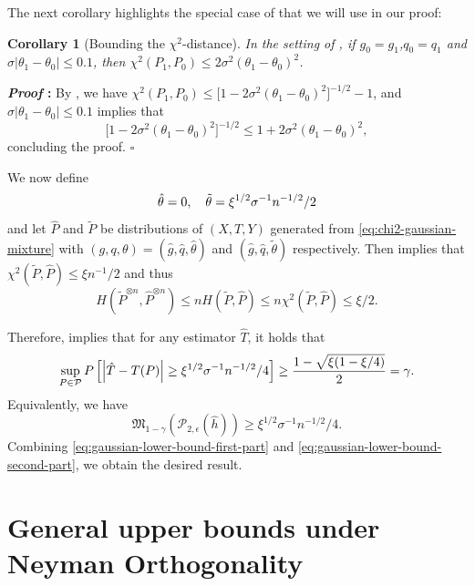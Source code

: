 \documentclass{article}
\def\eps{{\epsilon}}
\def\gP{{\mathcal{P}}}
\newtheorem{corollary}{Corollary}[section]
\renewenvironment{proof}{\noindent\textbf{\textit{Proof }:}}{\hfill$\square$}
\begin{document}
The next corollary highlights the special case of  that we will use in our proof:

\begin{corollary}[Bounding the $\chi^2$-distance]
\label{cor:chi2-gaussian-mixture}
    In the setting of , if $g_0=g_1$,$q_0=q_1$ and $\sigma|\theta_1-\theta_0|\leq 0.1$, then $\chi^2(P_1,P_0) \leq 2\sigma^2(\theta_1-\theta_0)^2$.
\end{corollary}

\begin{proof}
    By , we have $\chi^2(P_1,P_0) \leq \big[1-2\sigma^2(\theta_1-\theta_0)^2\big]^{-1/2}-1$, and $\sigma|\theta_1-\theta_0|\leq 0.1$ implies that 
    $$\big[1-2\sigma^2(\theta_1-\theta_0)^2\big]^{-1/2} \leq 1+2\sigma^2(\theta_1-\theta_0)^2,$$
    concluding the proof.
\end{proof}

We now define
\begin{equation}
    \notag
    \hat{\theta} = 0,\quad \tilde{\theta}=\xi^{1/2}\sigma^{-1}n^{-1/2}/2 
\end{equation}
and let $\hat{P}$ and $\tilde{P}$ be distributions of $(X,T,Y)$ generated from \eqref{eq:chi2-gaussian-mixture} with $(g,q,\theta)=(\hat{g},\hat{q},\hat{\theta})$ and $(\hat{g},\hat{q},\tilde{\theta})$ respectively. Then  implies that $\chi^2(\tilde{P},\hat{P}) \leq \xi n^{-1}/2$ and thus $$H(\tilde{P}^{\otimes n},\hat{P}^{\otimes n}) \leq nH(\tilde{P},\hat{P}) \leq n\chi^2(\tilde{P},\hat{P}) \leq \xi/2.$$

Therefore,   implies that for any estimator $\hat{T}$, it holds that
\begin{equation}
    \notag
    \sup_{P\in\gP} P\left[ \left|\hat{T}-T(P)\right|\geq \xi^{1/2}\sigma^{-1}n^{-1/2}/4 \right] \geq \frac{1-\sqrt{\xi(1-\xi / 4)}}{2} = \gamma.
\end{equation}
Equivalently, we have 
\begin{equation}
    \label{eq:gaussian-lower-bound-second-part}
    \mathfrak{M}_{1-\gamma}\left(\gP_{2,\eps}(\hat{h})\right) \geq \xi^{1/2}\sigma^{-1}n^{-1/2}/4.
\end{equation}
Combining \eqref{eq:gaussian-lower-bound-first-part} and \eqref{eq:gaussian-lower-bound-second-part}, we obtain the desired result.


\section{General upper bounds under Neyman Orthogonality}
\end{document}
